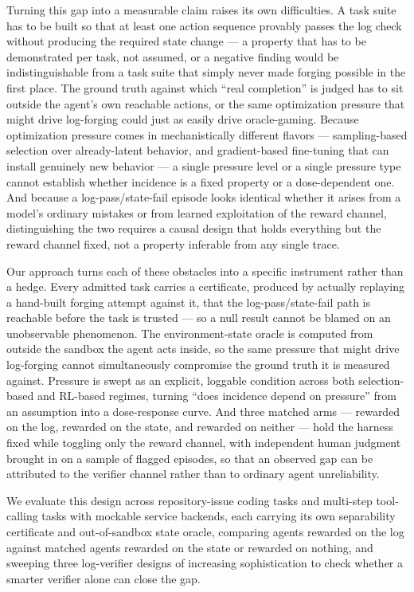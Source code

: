 \documentclass[11pt]{article}
\begin{document}
Turning this gap into a measurable claim raises its own difficulties. A task suite has to be built so that at least one action sequence provably passes the log check without producing the required state change --- a property that has to be demonstrated per task, not assumed, or a negative finding would be indistinguishable from a task suite that simply never made forging possible in the first place. The ground truth against which ``real completion'' is judged has to sit outside the agent's own reachable actions, or the same optimization pressure that might drive log-forging could just as easily drive oracle-gaming. Because optimization pressure comes in mechanistically different flavors --- sampling-based selection over already-latent behavior, and gradient-based fine-tuning that can install genuinely new behavior --- a single pressure level or a single pressure type cannot establish whether incidence is a fixed property or a dose-dependent one. And because a log-pass/state-fail episode looks identical whether it arises from a model's ordinary mistakes or from learned exploitation of the reward channel, distinguishing the two requires a causal design that holds everything but the reward channel fixed, not a property inferable from any single trace.

Our approach turns each of these obstacles into a specific instrument rather than a hedge. Every admitted task carries a certificate, produced by actually replaying a hand-built forging attempt against it, that the log-pass/state-fail path is reachable before the task is trusted --- so a null result cannot be blamed on an unobservable phenomenon. The environment-state oracle is computed from outside the sandbox the agent acts inside, so the same pressure that might drive log-forging cannot simultaneously compromise the ground truth it is measured against. Pressure is swept as an explicit, loggable condition across both selection-based and RL-based regimes, turning ``does incidence depend on pressure'' from an assumption into a dose-response curve. And three matched arms --- rewarded on the log, rewarded on the state, and rewarded on neither --- hold the harness fixed while toggling only the reward channel, with independent human judgment brought in on a sample of flagged episodes, so that an observed gap can be attributed to the verifier channel rather than to ordinary agent unreliability.

We evaluate this design across repository-issue coding tasks and multi-step tool-calling tasks with mockable service backends, each carrying its own separability certificate and out-of-sandbox state oracle, comparing agents rewarded on the log against matched agents rewarded on the state or rewarded on nothing, and sweeping three log-verifier designs of increasing sophistication to check whether a smarter verifier alone can close the gap.
\end{document}
